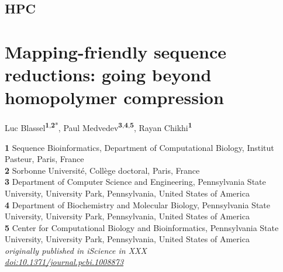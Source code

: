\documentclass[
  11,
]{scrbook}
\begin{document}
\hypertarget{hpc}{%
\section{HPC}\label{hpc}}

\hypertarget{mapping-friendly-sequence-reductions-going-beyond-homopolymer-compression}{%
\chapter{Mapping-friendly sequence reductions: going beyond homopolymer compression}\label{mapping-friendly-sequence-reductions-going-beyond-homopolymer-compression}}

Luc Blassel\textsuperscript{\textbf{1},\textbf{2}*}, Paul Medvedev\textsuperscript{\textbf{3},\textbf{4},\textbf{5}}, Rayan Chikhi\textsuperscript{\textbf{1}}

\textbf{1} Sequence Bioinformatics, Department of Computational Biology, Institut Pasteur, Paris,
France\\
\textbf{2} Sorbonne Université, Collège doctoral, Paris, France\\
\textbf{3} Department of Computer Science and Engineering, Pennsylvania State University, University Park, Pennsylvania, United States of America\\
\textbf{4} Department of Biochemistry and Molecular Biology, Pennsylvania State University, University Park, Pennsylvania, United States of America\\
\textbf{5} Center for Computational Biology and Bioinformatics, Pennsylvania State University, University Park, Pennsylvania, United States of America\\

\emph{originally published in iScience in XXX}\\
\emph{\href{https://doi.org/10.1371/journal.pcbi.1008873}{doi:10.1371/journal.pcbi.1008873}}

\newcommand{\stirling}[2]{\bigg\{%
\begin{matrix}
    #1 \\
    #2
\end{matrix}
\bigg\} }
\newcommand{\comb}[2]{\bigg(
\begin{matrix}
    #1 \\
    #2
\end{matrix}
\bigg) }

\newcommand{\lmer}{$\ell$-mer\xspace}
\newcommand{\lmers}{$\ell$-mers\xspace}
\newcommand{\iscomp}{\textsc{IsComp}\xspace}
\newcommand{\rccore}{RC-core-insensitive\xspace}
\newcommand{\minimap}{\texttt{minimap2}\xspace}
\newcommand{\winnowmap}{\texttt{winnowmap2}\xspace}
\newcommand{\msr}[1]{MSR$_{\text{#1}}$}
\end{document}
